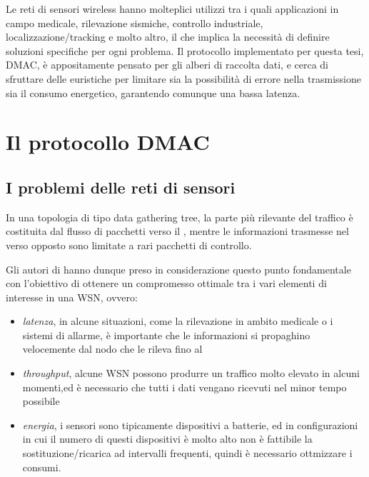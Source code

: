 \documentclass[twoside,11pt,a4paper,italian,openany]{book}
\begin{document}
Le reti di sensori wireless hanno molteplici utilizzi tra i quali applicazioni in campo 
medicale,  rilevazione sismiche,  controllo industriale, localizzazione/tracking e molto altro, 
il che implica la necessità di definire soluzioni specifiche per ogni problema. 
Il protocollo implementato per questa tesi, DMAC\cite{DMAC}, è appositamente pensato per gli 
alberi di raccolta dati, e cerca di sfruttare delle euristiche per limitare sia la 
possibilità di errore nella trasmissione sia il consumo energetico, garantendo comunque una 
bassa latenza.


\chapter{Il protocollo DMAC}
\section{I problemi delle reti di sensori}
In una topologia di tipo data gathering tree, la parte più rilevante del 
traffico è costituita dal flusso di pacchetti verso il \sink, mentre le informazioni 
trasmesse nel verso opposto sono limitate a rari pacchetti di controllo.

Gli autori di \cite{DMAC} hanno dunque preso in considerazione questo punto fondamentale con 
l'obiettivo di ottenere un compromesso ottimale tra i vari elementi di interesse in una WSN,
ovvero:

\begin{itemize}

\item \emph{latenza}, in alcune situazioni, come la rilevazione in ambito medicale o 
i sistemi di allarme, è importante che le informazioni si propaghino velocemente dal nodo che le 
rileva fino al \sink

\item \emph{throughput}, alcune WSN possono produrre un traffico molto elevato in alcuni momenti,ed è necessario che tutti i dati vengano ricevuti nel minor tempo possibile 

\item \emph{energia}, i sensori sono tipicamente dispositivi a batterie, ed in configurazioni
in cui il numero di questi dispositivi è molto alto non è fattibile la sostituzione/ricarica ad 
intervalli frequenti, quindi è necessario ottmizzare i consumi.

\end{itemize}
\end{document}
